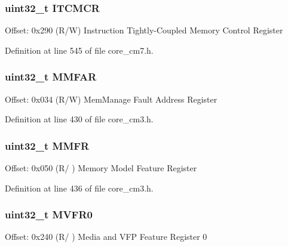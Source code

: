 \subsubsection[{\texorpdfstring{I\+T\+C\+M\+CR}{ITCMCR}}]{ uint32\+\_\+t I\+T\+C\+M\+CR}\hypertarget{struct_s_c_b___type_a18d1734811b40e7edf6e5213bf336ca8}{}\label{struct_s_c_b___type_a18d1734811b40e7edf6e5213bf336ca8}
Offset\+: 0x290 (R/W) Instruction Tightly-\/\+Coupled Memory Control Register 

Definition at line 545 of file core\+\_\+cm7.\+h.

\subsubsection[{\texorpdfstring{M\+M\+F\+AR}{MMFAR}}]{ uint32\+\_\+t M\+M\+F\+AR}\hypertarget{struct_s_c_b___type_ae9d94d186615d57d38c9253cb842d244}{}\label{struct_s_c_b___type_ae9d94d186615d57d38c9253cb842d244}
Offset\+: 0x034 (R/W) Mem\+Manage Fault Address Register 

Definition at line 430 of file core\+\_\+cm3.\+h.

\subsubsection[{\texorpdfstring{M\+M\+FR}{MMFR}}]{ uint32\+\_\+t M\+M\+FR}\hypertarget{struct_s_c_b___type_a2d4cde1c9462f3733ab65d97f308c6fb}{}\label{struct_s_c_b___type_a2d4cde1c9462f3733ab65d97f308c6fb}
Offset\+: 0x050 (R/ ) Memory Model Feature Register 

Definition at line 436 of file core\+\_\+cm3.\+h.

\subsubsection[{\texorpdfstring{M\+V\+F\+R0}{MVFR0}}]{ uint32\+\_\+t M\+V\+F\+R0}\hypertarget{struct_s_c_b___type_a9b0103b438c8922eaea5624f71afbbc8}{}\label{struct_s_c_b___type_a9b0103b438c8922eaea5624f71afbbc8}
Offset\+: 0x240 (R/ ) Media and V\+FP Feature Register 0 

